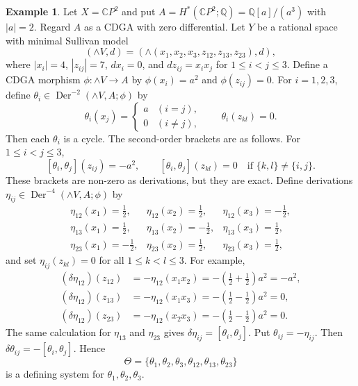 \documentclass[a4paper,10pt]{amsart}
\theoremstyle{definition}
\newtheorem{ex}[thm]{Example}
\theoremstyle{remark}
\newcommand{\Der}{\operatorname{Der}}
\numberwithin{equation}{section}
\begin{document}
\begin{ex}\label{ex:quadratic-cp2}
Let $X=\mathbb{C}P^2$ and put
$
A=H^*(\mathbb{C}P^2;\mathbb{Q})=\mathbb{Q}[a]/(a^3)
$
with $|a|=2$.
Regard $A$ as a CDGA with zero differential. Let $Y$ be a rational space
with minimal Sullivan model
\[
        (\wedge V,d)
        =
        (\wedge(x_1,x_2,x_3,z_{12},z_{13},z_{23}),d),
\]
where $|x_i|=4$, $|z_{ij}|=7$, $dx_i=0$, and $dz_{ij}=x_ix_j$
for $1\leq i<j\leq 3$.
Define a CDGA morphism
$
\phi:\wedge V\to A
$
by
$\phi(x_i)=a^2$ and $\phi(z_{ij})=0$.
For $i=1,2,3$, define
$
\theta_i\in \Der^{-2}(\wedge V,A;\phi)
$
by
\[
        \theta_i(x_j)=
        \begin{cases}
        a & (i=j),\\
        0 & (i\neq j),
        \end{cases}
        \qquad
        \theta_i(z_{kl})=0.
\]
Then each $\theta_i$ is a cycle.
The second-order brackets are as follows. For $1\leq i<j\leq 3$,
\[
        [\theta_i,\theta_j](z_{ij})=-a^2,
        \qquad
        [\theta_i,\theta_j](z_{kl})=0
        \quad
        \text{if } \{k,l\}\neq \{i,j\}.
\]
These brackets are non-zero as derivations, but they are exact.
Define derivations $\eta_{ij}\in \Der^{-4}(\wedge V,A;\phi)$ by
\[
\begin{array}{lll}
        \eta_{12}(x_1)=\frac{1}{2},&
        \eta_{12}(x_2)=\frac{1}{2},&
        \eta_{12}(x_3)=-\frac{1}{2},\\[2mm]
        \eta_{13}(x_1)=\frac{1}{2},&
        \eta_{13}(x_2)=-\frac{1}{2},&
        \eta_{13}(x_3)=\frac{1}{2},\\[2mm]
        \eta_{23}(x_1)=-\frac{1}{2},&
        \eta_{23}(x_2)=\frac{1}{2},&
        \eta_{23}(x_3)=\frac{1}{2},
\end{array}
\]
and set $\eta_{ij}(z_{kl})=0$ for all $1\leq k<l\leq 3$.
For example,
\[
\begin{aligned}
        (\delta\eta_{12})(z_{12})
        &=
        -\eta_{12}(x_1x_2)
        =
        -\left(\frac{1}{2}+\frac{1}{2}\right)a^2
        =
        -a^2,\\
        (\delta\eta_{12})(z_{13})
        &=
        -\eta_{12}(x_1x_3)
        =
        -\left(\frac{1}{2}-\frac{1}{2}\right)a^2
        =
        0,\\
        (\delta\eta_{12})(z_{23})
        &=
        -\eta_{12}(x_2x_3)
        =
        -\left(\frac{1}{2}-\frac{1}{2}\right)a^2
        =
        0.
\end{aligned}
\]
The same calculation for $\eta_{13}$ and $\eta_{23}$ gives
$
\delta\eta_{ij}=[\theta_i,\theta_j].
$
Put
$
\theta_{ij}=-\eta_{ij}.
$
Then
$
\delta\theta_{ij}=-[\theta_i,\theta_j].
$
Hence
\[
        \Theta=
        \{\theta_1,\theta_2,\theta_3,\theta_{12},\theta_{13},\theta_{23}\}
\]
is a defining system for $\theta_1,\theta_2,\theta_3$.


\end{ex}
\end{document}
